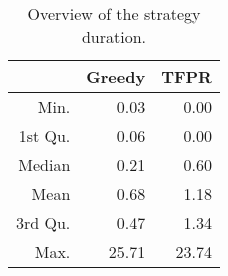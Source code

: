 \begin{table}[ht]
\centering
\begin{tabular}{rrr}
  \hline
 & Greedy & TFPR \\ 
  \hline
Min. & 0.03 & 0.00 \\ 
  1st Qu. & 0.06 & 0.00 \\ 
  Median & 0.21 & 0.60 \\ 
  Mean & 0.68 & 1.18 \\ 
  3rd Qu. & 0.47 & 1.34 \\ 
  Max. & 25.71 & 23.74 \\ 
   \hline
\end{tabular}
\caption{Overview of the strategy duration.} 
\label{tab:results:rq0:summary:duration}
\end{table}
